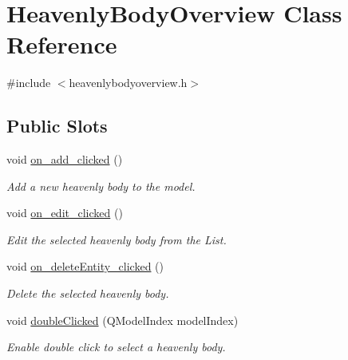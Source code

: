 \hypertarget{classHeavenlyBodyOverview}{
\section{\-Heavenly\-Body\-Overview \-Class \-Reference}
\label{d9/d59/classHeavenlyBodyOverview}
}


{\ttfamily \#include $<$heavenlybodyoverview.\-h$>$}

\subsection*{\-Public \-Slots}
\begin{DoxyCompactItemize}
\item 
void \hyperlink{classHeavenlyBodyOverview_ad23b61bfb27f1b479eb965c84af55462}{on\-\_\-add\-\_\-clicked} ()
\begin{DoxyCompactList}\small\item\em \-Add a new heavenly body to the model. \end{DoxyCompactList}\item 
void \hyperlink{classHeavenlyBodyOverview_a1bf8ee9ed5de9b020979f2cffde51e97}{on\-\_\-edit\-\_\-clicked} ()
\begin{DoxyCompactList}\small\item\em \-Edit the selected heavenly body from the \-List. \end{DoxyCompactList}\item 
void \hyperlink{classHeavenlyBodyOverview_a280498f7189f4c6578803120028c3fb7}{on\-\_\-delete\-Entity\-\_\-clicked} ()
\begin{DoxyCompactList}\small\item\em \-Delete the selected heavenly body. \end{DoxyCompactList}\item 
void \hyperlink{classHeavenlyBodyOverview_a85de3eefb0dab6d69a3d82ac47437eb6}{double\-Clicked} (\-Q\-Model\-Index model\-Index)
\begin{DoxyCompactList}\small\item\em \-Enable double click to select a heavenly body. \end{DoxyCompactList}\end{DoxyCompactItemize}
